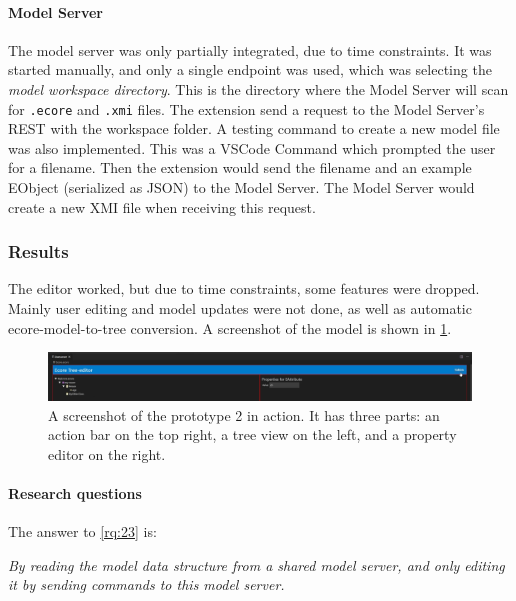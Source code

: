 


\paragraph*{Model Server}
The model server was only partially integrated, due to time constraints.
It was started manually, and only a single endpoint was used, which was selecting the \emph{model workspace directory}.
This is the directory where the Model Server will scan for \texttt{.ecore} and \texttt{.xmi} files.
The extension send a request to the Model Server's \gls{REST}  with the workspace folder.
A testing command to create a new model file was also implemented.
This was a VSCode Command which prompted the user for a filename.
Then the extension would send the filename and an example EObject (serialized as \gls{JSON}) to the Model Server.
The Model Server would create a new \gls{XMI} file when receiving this request.


\subsubsection{Results}
The editor worked, but due to time constraints, some features were dropped.
Mainly user editing and model updates were not done, as well as automatic ecore-model-to-tree conversion.
A screenshot of the model is shown in \cref{fig:prototype-2-screenshot}.

\begin{figure}[htbp]
  \centering
  \includegraphics[width=\textwidth]{figures/prototype-2-screenshot.png}
  \caption[Prototype 2 Screenshot]{A screenshot of the prototype 2 in action. It has three parts: an action bar on the top right, a tree view on the left, and a property editor on the right.}\label{fig:prototype-2-screenshot}
\end{figure}

\paragraph*{Research questions}
The answer to \cref{rq:23} is:
\begin{displayquote}
  \emph{By reading the model data structure from a shared model server, and only editing it by sending commands to this model server.}
\end{displayquote}

